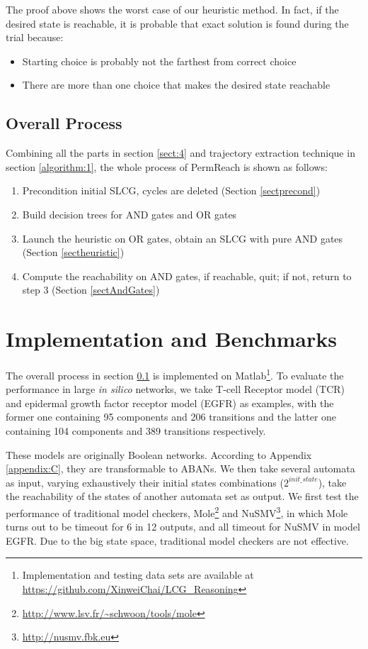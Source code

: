 \documentclass[runningheads]{llncs}
\begin{document}
The proof above shows the worst case of our heuristic method. In fact, if the desired state is reachable, it is probable that exact solution is found during the trial because:
\begin{itemize}
\item Starting choice is probably not the farthest from correct choice
\item There are more than one choice that makes the desired state reachable
\end{itemize}

\subsection{Overall Process}\label{sectOverall}
Combining all the parts in section \ref{sect:4} and trajectory extraction technique in section \ref{algorithm:1}, the whole process of PermReach is shown as follows:
\begin{enumerate}
\item Precondition initial SLCG, cycles are deleted (Section \ref{sectprecond})
\item Build decision trees for AND gates and OR gates
\item Launch the heuristic on OR gates, obtain an SLCG with pure AND gates (Section \ref{sectheuristic})
\item Compute the reachability on AND gates, if reachable, quit; if not, return to step 3 (Section \ref{sectAndGates})
\end{enumerate}

\section{Implementation and Benchmarks}\label{sect:5}
The overall process in section \ref{sectOverall} is implemented on Matlab\footnote{Implementation and testing data sets are available at \url{https://github.com/XinweiChai/LCG_Reasoning}}. To evaluate the performance in large \textit{in silico} networks, we take T-cell Receptor model (TCR) \cite{saez2007logical} and epidermal growth factor receptor model (EGFR) \cite{samaga2009logic} as examples, with the former one containing 95 components and 206 transitions and the latter one containing 104 components and 389 transitions respectively. 

These models are originally Boolean networks. According to Appendix \ref{appendix:C}, they are transformable to ABANs. We then take several automata as input, varying exhaustively their initial states combinations ($2^{init\_state}$), take the reachability of the states of another automata set as output. We first test the performance of traditional model checkers, Mole\footnote{\url{http://www.lsv.fr/~schwoon/tools/mole}} and NuSMV\footnote{\url{http://nusmv.fbk.eu}}, in which Mole turns out to be timeout for 6 in 12 outputs, and all timeout for NuSMV in model EGFR. Due to the big state space, traditional model checkers are not effective. 
\end{document}
